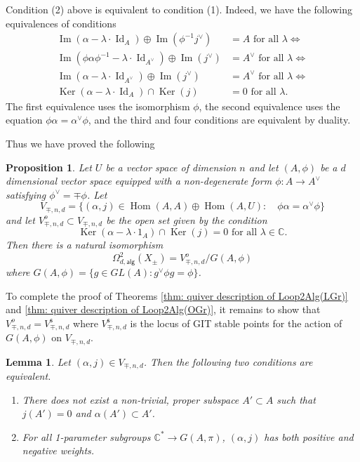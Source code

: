 \documentclass{amsart}
\newtheorem{proposition}[theorem]{Proposition}
\newtheorem{lemma}[theorem]{Lemma}
\theoremstyle{definition}
\newcommand{\CC} {{\mathbb C}}          %
\newcommand{\Hom}{\operatorname{Hom}}
\newcommand{\Ker}{\operatorname{Ker}}
\newcommand{\im}{\operatorname{Im}}
\newcommand{\alg}{\mathsf{alg}}
\newcommand{\open}{\mathsf{o}}
\newcommand{\stable}{\mathsf{s}}
\newcommand{\LoopTwo}{\Omega^{2}_{d,\alg}}
\newcommand{\Id}{\operatorname{Id}}
\newcommand{\Xpm}{X_{\pm}}
\begin{document}
\bigskip

Condition (2) above is equivalent to condition (1). Indeed, we have
the following equivalences of conditions
\begin{align*}
\im (\alpha -\lambda \cdot \Id_{A})\oplus  \im (\phi^{-1}j^{\vee} )&=A
\text{ for all } \lambda \iff \\
\im (\phi \alpha\phi^{-1} -\lambda \cdot \Id_{A^{\vee }})\oplus  \im
(j^{\vee} )&=A^{\vee }
\text{ for all } \lambda \iff \\
\im (\alpha -\lambda \cdot \Id_{A^{\vee }})\oplus  \im
(j^{\vee} )&=A^{\vee }
\text{ for all } \lambda \iff \\
\Ker (\alpha -\lambda \cdot \Id_{A})\cap \Ker (j) &= 0 \text{ for all } \lambda .
\end{align*}
The first equivalence uses the isomorphism $\phi$, the second
equivalence uses the equation $\phi \alpha  = \alpha^{\vee}\phi$, and
the third and four conditions are equivalent by duality.

Thus we have proved the following
\begin{proposition}\label{prop: quiver description of Loop2Alg(Xpm)
with explicit open condition}
Let $U$ be a vector space of dimension $n$ and let $(A,\phi )$ be a
$d$ dimensional vector space equipped with a non-degenerate form $\phi
:A\to A^{\vee}$ satisfying $\phi^{\vee}=\mp \phi$. Let
\[
V_{\mp ,n,d} = \{(\alpha ,j)\in \Hom (A,A)\oplus \Hom (A,U):\quad \phi
\alpha =\alpha^{\vee}\phi \}
\]
and let $V^{o}_{\mp ,n,d}\subset V_{\mp ,n,d}$ be the open set given
by the condition
\[
\Ker (\alpha -\lambda \cdot 1_{A})\cap \Ker (j) = 0\text{ for all } \lambda \in \CC .
\]
Then there is a natural isomorphism
\[
\LoopTwo (\Xpm ) = V^{o}_{\mp ,n,d}/G(A,\phi )
\]
where $G(A,\phi ) = \{g\in GL(A): g^{\vee}\phi g = \phi \}$. 
\end{proposition}

To complete the proof of Theorems \ref{thm: quiver description of
Loop2Alg(LGr)} and \ref{thm: quiver description of Loop2Alg(OGr)}, it
remains to show that $V^{o}_{\mp ,n,d} = V^{\stable }_{\mp ,n,d}$
where $V^{\stable }_{\mp ,n,d}$ is the locus of GIT stable points for
the action of $G(A,\phi )$ on $V_{\mp ,n,d}$.

\begin{lemma}\label{lem: Vo =Vs for the Lgr quiver}
Let $(\alpha ,j)\in V_{\mp ,n,d}$. Then the following two conditions
are equivalent.\begin{enumerate}
\item [($\open$)] There does not exist a non-trivial, proper subspace
$A'\subset A$ such that $j(A')=0$ and $\alpha (A')\subset A'$.
\item [($\stable$)] For all 1-parameter subgroups $\CC^{*}\to G(A,\pi )$,
$(\alpha ,j)$ has both positive and negative weights. 
\end{enumerate}
\end{lemma}
\end{document}
